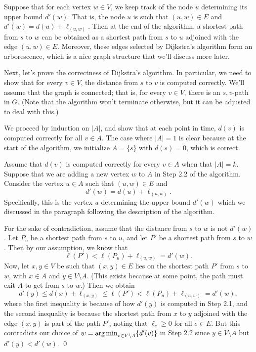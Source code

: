 Suppose that for each vertex $w \in V$, we keep track of the node $u$ 
determining its upper bound $d'(w)$. That is, the node $u$ is such that 
$(u, w) \in E$ and $d'(w) = d(u) + \ell_{(u, w)}$. Then at the end of the 
algorithm, a shortest path from $s$ to $w$ can be obtained as a shortest path 
from $s$ to $u$ adjoined with the edge $(u, w) \in E$. Moreover, these edges 
selected by Dijkstra's algorithm form an arborescence, which is a nice graph 
structure that we'll discuss more later. 

Next, let's prove the correctness of Dijkstra's algorithm. In particular, 
we need to show that for every $v \in V$, the distance from $s$ to $v$ 
is computed correctly. We'll assume that the graph is connected; that is, 
for every $v \in V$, there is an $s, v$-path in $G$. (Note that the 
algorithm won't terminate otherwise, but it can be adjusted to deal 
with this.)

\begin{pf}
    We proceed by induction on $|A|$, and show that at each point in time, 
    $d(v)$ is computed correctly for all $v \in A$. The case where $|A| = 1$ 
    is clear because at the start of the algorithm, we initialize $A = \{s\}$ 
    with $d(s) = 0$, which is correct. 

    Assume that $d(v)$ is computed correctly for every $v \in A$ when 
    that $|A| = k$. Suppose that we are adding a new vertex $w$ to $A$ 
    in Step 2.2 of the algorithm. Consider the vertex $u \in A$ such that 
    $(u, w) \in E$ and 
    \[ d'(w) = d(u) + \ell_{(u, w)}. \] 
    Specifically, this is the vertex $u$ determining the upper bound 
    $d'(w)$ which we discussed in the paragraph following the description 
    of the algorithm. 

    For the sake of contradiction, assume that the distance from $s$ to $w$ 
    is not $d'(w)$. Let $P_u$ be a shortest path from $s$ to $u$, and 
    let $P'$ be a shortest path from $s$ to $w$. Then by our 
    assumption, we know that 
    \[ \ell(P') < \ell(P_u) + \ell_{(u, w)} = d'(w). \] 
    Now, let $x, y \in V$ be such that $(x, y) \in E$ lies on the shortest 
    path $P'$ from $s$ to $w$, with $x \in A$ and $y \in V \setminus A$. 
    (This exists because at some point, the path must exit $A$ to get 
    from $s$ to $w$.) Then we obtain 
    \[ d'(y) \leq d(x) + \ell_{(x,y)} \leq \ell(P') < \ell(P_u) 
    + \ell_{(u, w)} = d'(w), \] 
    where the first inequality is because of how $d'(y)$ is computed in 
    Step 2.1, and the second inequality is because the shortest path 
    from $x$ to $y$ adjoined with the edge $(x, y)$ is part of the path $P'$, 
    noting that $\ell_e \geq 0$ for all $e \in E$. But this contradicts 
    our choice of $w = \operatorname*{arg\,min}_{v\in V \setminus A} \{d'(v)\}$ in Step 2.2 
    since $y \in V \setminus A$ but $d'(y) < d'(w)$. \qed
\end{pf}\vspace{-0.25cm}

